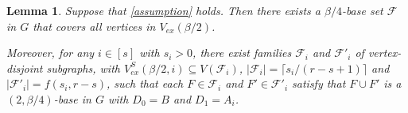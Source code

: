 \documentclass[11pt, a4paper]{article}
\newtheorem{lemma}[theorem]{Lemma}
\theoremstyle{definition}
\newcommand{\<}{\subseteq}
\begin{document}
\begin{lemma}\label{Exceptional}
     Suppose that \ref{assumption} holds. %
     Then there exists a ${\beta}/{4}$-base set $\mathcal{F}$ in $G$ that covers all vertices in $V_{ex}(\beta/2)$.

{Moreover, for any $i \in [s]$ with $s_i > 0$, there exist families $\mathcal{F}_i$ and $\mathcal{F}'_i$ of vertex-disjoint subgraphs, with $V_{ex}^S(\beta/2,i)\subseteq V(\mathcal{F}_i)$, $|\mathcal{F}_i| = \lceil s_i/(r-s+1) \rceil$  and $|\mathcal{F}'_i| = f(s_i, r-s)$, such that each $F \in \mathcal{F}_i$ and $F' \in \mathcal{F}'_i$ satisfy that $F \cup F'$ is a $(2, \beta/4)$-base in $G$ with $D_0 = B$ and $D_1 = A_i$.}

\end{lemma}
\end{document}
